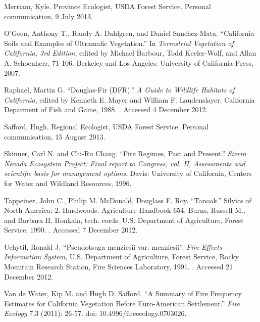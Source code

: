\begin{hangparas}{.25in}{1}
Merriam, Kyle. Province Ecologist, USDA Forest Service. Personal communication, 9 July 2013.

O'Geen, Anthony T., Randy A. Dahlgren, and Daniel Sanchez-Mata. ``California Soils and Examples of Ultramafic Vegetation.'' In \emph{Terrestrial Vegetation of California, 3rd Edition}, edited by Michael Barbour, Todd Keeler-Wolf, and Allan A. Schoenherr, 71-106. Berkeley and Los Angeles: University of California Press, 2007. 

Raphael, Martin G. ``Douglas-Fir (DFR).'' \emph{A Guide to Wildlife Habitats of California}, edited by Kenneth E. Mayer and William F. Laudenslayer. California Deparment of Fish and Game, 1988. . Accessed 4 December 2012.

Safford, Hugh. Regional Ecologist, USDA Forest Service. Personal communication, 15 August 2013.

Skinner, Carl N. and Chi-Ru Chang. ``Fire Regimes, Past and Present.'' \emph{Sierra Nevada Ecosystem Project: Final report to Congress, vol. II, Assessments and scientific basis for management options}. Davis: University of California, Centers for Water and Wildland Resources, 1996.

Tappeiner, John C., Philip M. McDonald, Douglass F. Roy. ``Tanoak.'' Silvics of North America: 2. Hardwoods. Agriculture Handbook 654. Burns, Russell M., and Barbara H. Honkala, tech. cords. U.S. Department of Agriculture, Forest Service, 1990. . Accessed 7 December 2012.

Uchytil, Ronald J. ``Pseudotsuga menziesii var. menziesii''.  \emph{Fire Effects Information System}, U.S. Department of Agriculture, Forest Service,  Rocky Mountain Research Station, Fire Sciences Laboratory, 1991. . Accessed 21 December 2012.

Van de Water, Kip M. and Hugh D. Safford. ``A Summary of Fire Frequency Estimates for California Vegetation Before Euro-American Settlement.'' \emph{Fire Ecology} 7.3 (2011): 26-57. doi: 10.4996/fireecology.0703026.
\end{hangparas}
